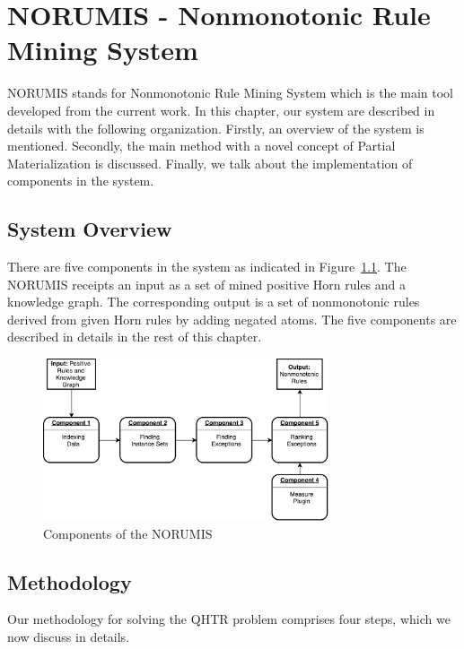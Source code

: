 \chapter{NORUMIS - Nonmonotonic Rule Mining System}\label{sec:meth}

NORUMIS stands for Nonmonotonic Rule Mining System which is the main tool developed from the current work. In this chapter, our system are described in details with the following organization. Firstly, an overview of the system is mentioned. Secondly, the main method with a novel concept of Partial Materialization is discussed. Finally, we talk about the implementation of components in the system.

\section{System Overview}

There are five components in the system as indicated in Figure~\ref{system_overview}. The NORUMIS receipts an input as a set of mined positive Horn rules and a knowledge graph. The corresponding output is a set of nonmonotonic rules derived from given Horn rules by adding negated atoms. The five components are described in details in the rest of this chapter.

\begin{figure}[ht]
\centering
\includegraphics[width=0.75\textwidth]{figures/system_overview}
\caption{Components of the NORUMIS}
\label{system_overview}
\end{figure}

\section{Methodology}

Our methodology for solving the QHTR problem comprises four steps, which we now discuss in details.
\medskip


